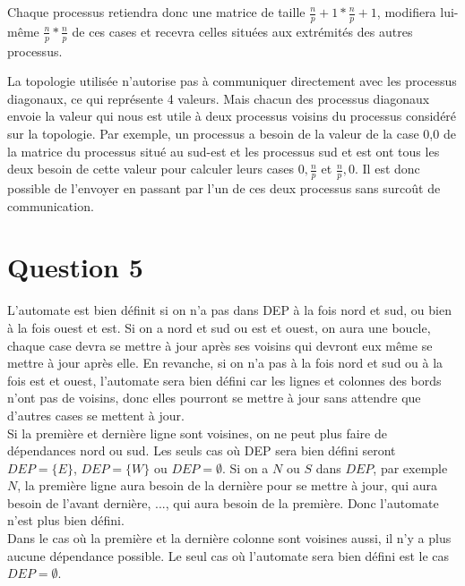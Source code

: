 \documentclass[a4paper,11pt]{article}
\begin{document}
Chaque processus retiendra donc une matrice de taille  $\frac n p +1* \frac n p +1$, modifiera lui-même $\frac n p * \frac n p$ de ces cases et recevra celles situées aux extrémités des autres processus.

La topologie utilisée n'autorise pas à communiquer directement avec les processus diagonaux, ce qui représente 4 valeurs. Mais chacun des processus diagonaux envoie la valeur qui nous est utile à deux processus voisins du processus considéré sur la topologie. Par exemple, un processus a besoin de la valeur de la case 0,0 de la matrice du processus situé au sud-est et les processus sud et est ont tous les deux besoin de cette valeur pour calculer leurs cases $0,\frac n p$ et $\frac n p,0$. Il est donc possible de l'envoyer en passant par l'un de ces deux processus sans surcoût de communication.






\section*{Question 5}
L'automate est bien définit si on n'a pas dans DEP à la fois nord et sud, ou bien à la fois ouest et est. Si on a nord et sud ou est et ouest, on aura une boucle, chaque case devra se mettre à jour après ses voisins qui devront eux même se mettre à jour après elle.
En revanche, si on n'a pas à la fois nord et sud ou à la fois est et ouest, l'automate sera bien défini car les lignes et colonnes des bords n'ont pas de voisins, donc elles pourront se mettre à jour sans attendre que d'autres cases se mettent à jour.\\
Si la première et dernière ligne sont voisines, on ne peut plus faire de dépendances nord ou sud. Les seuls cas où DEP sera bien défini seront $DEP = \{E\}$, $DEP = \{W\}$ ou $DEP = \emptyset$. Si on a $N$ ou $S$ dans $DEP$, par exemple $N$, la première ligne aura besoin de la dernière pour se mettre à jour, qui aura besoin de l'avant dernière, ..., qui aura besoin de la première. Donc l'automate n'est plus bien défini.\\
Dans le cas où la première et la dernière colonne sont voisines aussi, il n'y a plus aucune dépendance possible. Le seul cas où l'automate sera bien défini est le cas $DEP = \emptyset$.
\end{document}
